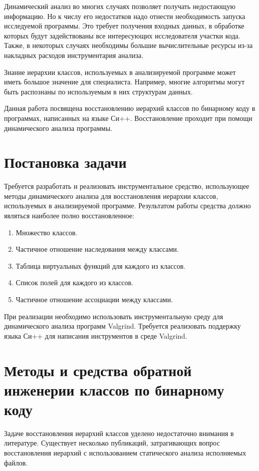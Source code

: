 \documentclass[a4paper,12pt,russian]{article}
\begin{document}
Динамический анализ во многих случаях позволяет получать недостающую информацию. Но к числу его недостатков надо отнести необходимость запуска исследуемой программы.
Это требует получения входных данных, в обработке которых будут задействованы все интересующих исследователя участки кода.
Также, в некоторых случаях необходимы большие вычислительные ресурсы из-за накладных расходов инструментария анализа.

Знание иерархии классов, используемых в анализируемой программе может иметь большое значение для специалиста. Например, многие алгоритмы могут быть распознаны по используемым в них структурам данных.

Данная работа посвящена восстановлению иерархий классов по бинарному коду в программах, написанных на языке Си++.
Восстановление проходит при помощи динамического анализа программы.

\newpage
\section{Постановка задачи}
Требуется разработать и реализовать инструментальное средство, использующее методы динамического анализа для восстановления иерархии классов, используемых в анализируемой программе.
Результатом работы средства должно являться наиболее полно восстановленное:
\begin{enumerate}
\item Множество классов.
\item Частичное отношение наследования между классами.
\item Таблица виртуальных функций для каждого из классов.
\item Список полей для каждого из классов.
\item Частичное отношение ассоциации между классами.
\end{enumerate}

При реализации необходимо использовать инструментальную среду для динамического анализа программ Valgrind.
Требуется реализовать поддержку языка Си++ для написания инструментов в среде Valgrind.

\newpage
\section{Методы и средства обратной инженерии классов по бинарному коду}
\label{reverse_eng_overview}
Задаче восстановления иерархий классов уделено недостаточно внимания в литературе.
Существует несколько публикаций, затрагивающих вопрос восстановления иерархий с использованием статического анализа исполняемых файлов.
\end{document}
